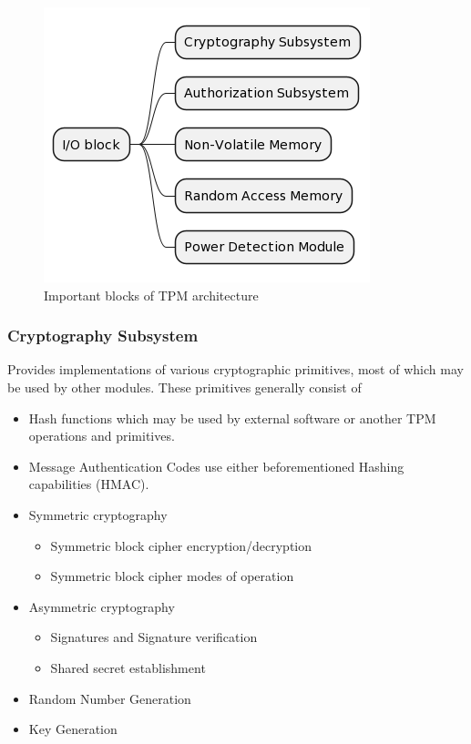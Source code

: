 \begin{figure}[h]
    \centering
    \includegraphics[width=\textwidth-6cm]{img/tpm-arch-diagram.png}
    \caption{Important blocks of TPM architecture}
    \label{fig:tpm-arch-scheme}
\end{figure}

\subsubsection{Cryptography Subsystem}
Provides implementations of various cryptographic primitives, most of which may be used by other modules. These primitives generally consist of 
\begin{itemize}
    \item Hash functions which may be used by external software or another TPM operations and primitives.
    \item Message Authentication Codes use either beforementioned Hashing capabilities (HMAC).
    \item Symmetric cryptography
        \begin{itemize}
            \item Symmetric block cipher encryption/decryption
            \item Symmetric block cipher modes of operation
        \end{itemize}
    \item Asymmetric cryptography
        \begin{itemize}
            \item Signatures and Signature verification
            \item Shared secret establishment
        \end{itemize}
    \item Random Number Generation
    \item Key Generation
\end{itemize}

